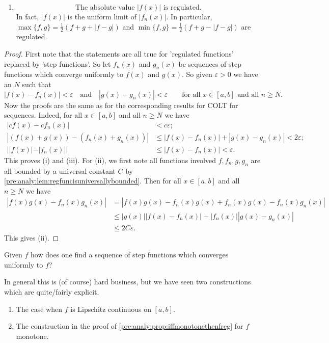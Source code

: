 \documentclass[10pt, a4paper]{article}
\begin{document}
\begin{proposition}
\begin{enumerate}[label = (\roman*)]
        \item 
        \[
        \text{The absolute value } |f(x)|\text{ is regulated}.
        \]
        In fact,
        $|f(x)|$ is the uniform limit of $|f_n(x)|$.
        In particular,
        $\max\{f, g\} = \frac{1}{2}(f + g + |f - g|)$ and $\min\{f, g\} = \frac{1}{2}(f + g - |f - g|)$ are regulated.
    \end{enumerate}
    \begin{proof}
        First note that the statements are all true for 'regulated functions' replaced by 'step functions'.
        So let $f_n(x)$ and $g_n(x)$ be sequences of step functions which converge uniformly to $f(x)$ and $g(x)$.
        So given $\varepsilon > 0$ we have an $N$ such that
        \[
        |f(x) - f_n(x)| < \varepsilon\quad\text{and}\quad|g(x) - g_n(x)| < \varepsilon\qquad\text{for all } x \in [a, b] \text{ and all } n \geq N.
        \]
        Now the proofs are the same as for the corresponding results for COLT for sequences.
        Indeed,
        for all $x \in [a, b]$ and all $n \geq N$ we have
        \begin{align*}
            |cf(x) - cf_n(x)| &< c\varepsilon; \\
            |(f(x) + g(x)) - (f_n(x) + g_n(x))| &\leq |f(x) - f_n(x)| + |g(x) - g_n(x)| < 2\varepsilon; \\
            ||f(x)| - |f_n(x)|| &\leq |f(x) - f_n(x)| < \varepsilon.
        \end{align*}
        This proves (i) and (iii).
        For (ii),
        we first note all functions involved $f, f_n, g, g_n$ are all bounded by a universal constant $C$ by \autoref{pre:analy:lem:regfuncisuniversallybounded}.
        Then for all $x \in [a, b]$ and all $n \geq N$ we have
        \begin{align*}
            |f(x)g(x) - f_n(x)g_n(x)| &= |f(x)g(x) - f_n(x)g(x) + f_n(x)g(x) - f_n(x)g_n(x)| \\
            &\leq |g(x)||f(x) - f_n(x)| + |f_n(x)||g(x) - g_n(x)| \\
            &\leq 2C\varepsilon.
        \end{align*}
        This gives (ii).
    \end{proof}
\end{proposition}

\begin{remark}
    Given $f$ how does one find a sequence of step functions which converges uniformly to $f$?

    In general this is
    (of course)
    hard business,
    but we have seen two constructions which are quite/fairly explicit.
    \begin{enumerate}[label = (\arabic*):]
        \item The case when $f$ is Lipschitz continuous on $[a, b]$.
        \item The construction in the proof of \autoref{pre:analy:prop:iffmonotonethenfreg} for $f$ monotone.
    \end{enumerate}
\end{remark}
\end{document}
